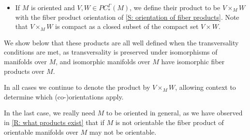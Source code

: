 \begin{definition}
\begin{itemize}
		\item If $M$ is oriented and $V,W \in PC_*^\Gamma(M)$, we define their product to be $V \times_M W$ with the fiber product orientation of \cref{S: orientation of fiber products}.
		Note that $V \times_M W$ is compact as a closed subset of the compact set $V \times W$.
	\end{itemize}

	We show below that these products are all well defined when the transversality conditions are met, as transversality is preserved under isomorphisms of manifolds over $M$, and isomorphic manifolds over $M$ have isomorphic fiber products over $M$.

	In all cases we continue to denote the product by $V \times_M W$, allowing context to determine which (co\nobreakdash-)orientations apply.
\end{definition}



In the last case, we really need $M$ to be oriented in general, as we have observed in \cref{R: what products exist} that if $M$ is not orientable the fiber product of orientable manifolds over $M$ may not be orientable.

\begin{comment}
	In the cases where $r_V$ and $r_W$ are transverse embeddings, these products are represented by just taking intersections, with the orientations or co-orientations given explicitly in \cref{P: normal pullback,P: cap of immersions,P: orient intersection}.
	If $r_V$ and $r_W$ are immersions, these descriptions hold locally.
\end{comment}

